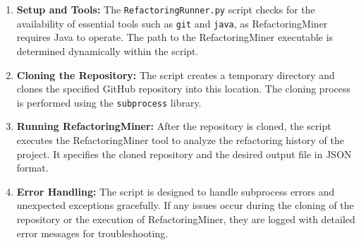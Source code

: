 \documentclass[sigconf]{acmart}
\begin{document}
\begin{enumerate}
    \item \textbf{Setup and Tools:} The \texttt{RefactoringRunner.py} script checks for the availability of essential tools such as \texttt{git} and \texttt{java}, as RefactoringMiner requires Java to operate. The path to the RefactoringMiner executable is determined dynamically within the script.

    \item \textbf{Cloning the Repository:} The script creates a temporary directory and clones the specified GitHub repository into this location. The cloning process is performed using the \texttt{subprocess} library.

    \item \textbf{Running RefactoringMiner:} After the repository is cloned, the script executes the RefactoringMiner tool to analyze the refactoring history of the project. It specifies the cloned repository and the desired output file in JSON format.

    \item \textbf{Error Handling:} The script is designed to handle subprocess errors and unexpected exceptions gracefully. If any issues occur during the cloning of the repository or the execution of RefactoringMiner, they are logged with detailed error messages for troubleshooting.


\end{enumerate}
\end{document}
